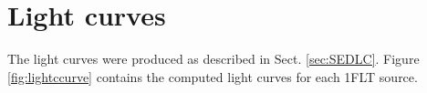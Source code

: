 \documentclass{aastex62}
\begin{document}
\begin{longrotatetable}
\end{longrotatetable}


\begin{longrotatetable}
\end{longrotatetable}


\begin{longrotatetable}
\end{longrotatetable}








\clearpage
\newpage
\section{Light curves}\label{sec:light}
The light curves were produced as described in Sect. \ref{sec:SEDLC}. Figure \ref{fig:lightccurve} contains the computed light curves for each 1FLT source.




\end{document}
